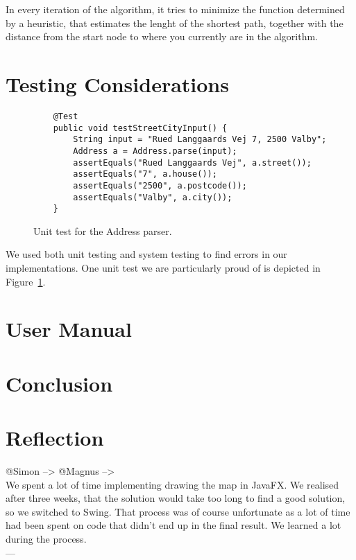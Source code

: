 \documentclass[11pt]{article}
\begin{document}
In every iteration of the algorithm, it tries to minimize the function determined by a heuristic, that estimates the lenght of the shortest path, together with the distance from the start node to where you currently are in the algorithm.

\label{sec:technical}


\section{Testing Considerations}\label{sec:testing}

\begin{figure}[t!]
    \begin{lstlisting}
    @Test
    public void testStreetCityInput() {
        String input = "Rued Langgaards Vej 7, 2500 Valby";
        Address a = Address.parse(input);
        assertEquals("Rued Langgaards Vej", a.street());
        assertEquals("7", a.house());
        assertEquals("2500", a.postcode());
        assertEquals("Valby", a.city());
    }
    \end{lstlisting}
    \caption{Unit test for the Address parser.}
    \label{fig:unittest}
\end{figure}

We used both unit testing and system testing to find errors in our implementations. One unit test we are particularly proud of is depicted in Figure~\ref{fig:unittest}.

\section{User Manual}\label{sec:manual}

\section{Conclusion}\label{sec:conclusion}

\section{Reflection}\label{sec:reflection}
@Simon --> @Magnus --> \\
We spent a lot of time implementing drawing the map in JavaFX. We realised after three weeks, that the solution would take too long to find a good solution, so we switched to Swing. That process was of course unfortunate as a lot of time had been spent on code that didn't end up in the final result. We learned a lot during the process.\\
---
\end{document}
